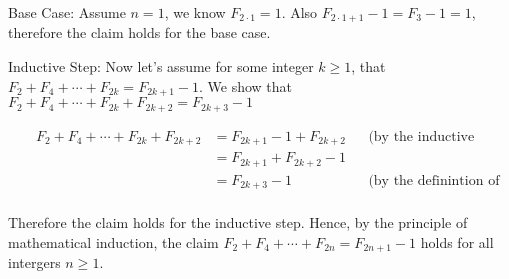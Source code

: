 \documentclass[10pt]{article}
\def \n {\par \vspace{\baselineskip}}
\begin{document}
\n Base Case: Assume $n = 1$, we know $F_{2 \cdot 1} = 1$.  Also $F_{2 \cdot 1 + 1} - 1 = F_3 - 1 = 1$, therefore the claim holds for the base case.

\n Inductive Step: Now let's assume for some integer $k \geq 1$, that $F_2 + F_4 + \cdots + F_{2k} = F_{2k+1} - 1$.  We show that
$F_2 + F_4 + \cdots + F_{2k} + F_{2k + 2} = F_{2k+3} - 1$

\begin{align*}
    && F_2 + F_4 + \cdots + F_{2k} + F_{2k + 2} &= F_{2k+1} - 1 + F_{2k + 2} && \text{(by the inductive hypothesis)} \\
    && &= F_{2k+1} + F_{2k + 2} - 1 && \\
    && &= F_{2k+3} - 1 && \text{(by the definintion of the Fibonacci Sequence)} \\
\end{align*}

Therefore the claim holds for the inductive step.  Hence, by the principle of mathematical induction, the claim
$F_2 + F_4 + \cdots + F_{2n} = F_{2n+1} - 1$ holds for all intergers $n \geq 1$.
\end{document}
